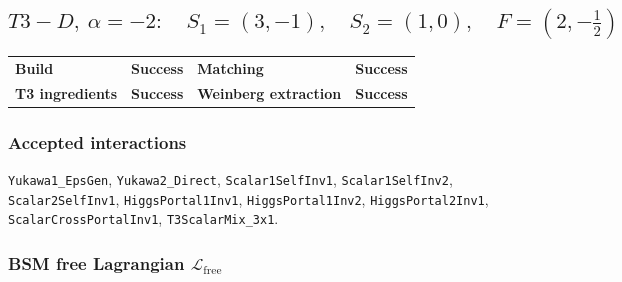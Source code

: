 \documentclass[10pt]{article}
\begin{document}
\subsection*{$T3-D,\ \alpha=-2:\quad S_1=(3,-1),\quad S_2=(1,0),\quad F=(2,-\frac{1}{2})$}
\begin{center}
\begin{tabular}{>{\bfseries}l l >{\bfseries}l l}
\toprule
Build & \textbf{Success} & Matching & \textbf{Success} \\
T3 ingredients & \textbf{Success} & Weinberg extraction & \textbf{Success} \\
\bottomrule
\end{tabular}
\end{center}
\subsubsection*{Accepted interactions}
\texttt{Yukawa1\_EpsGen}, \texttt{Yukawa2\_Direct}, \texttt{Scalar1SelfInv1}, \texttt{Scalar1SelfInv2}, \texttt{Scalar2SelfInv1}, \texttt{HiggsPortal1Inv1}, \texttt{HiggsPortal1Inv2}, \texttt{HiggsPortal2Inv1}, \texttt{ScalarCrossPortalInv1}, \texttt{T3ScalarMix\_3x1}.
\subsubsection*{BSM free Lagrangian $\mathcal{L}_{\mathrm{free}}$}
\noindent{}\par
\smallskip
\noindent{}\par
\smallskip
\noindent{}\par
\smallskip
\noindent{}\par
\smallskip
\noindent{}\par
\smallskip
\noindent{}\par
\smallskip
\end{document}
